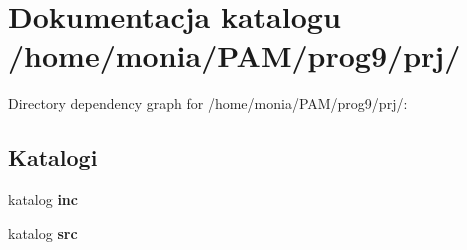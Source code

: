 \section{\-Dokumentacja katalogu /home/monia/\-P\-A\-M/prog9/prj/}
\label{dir_09d352d84568c784d5c2b0126c0f5faf}
\-Directory dependency graph for /home/monia/\-P\-A\-M/prog9/prj/\-:
\subsection*{\-Katalogi}
\begin{DoxyCompactItemize}
\item 
katalog {\bf inc}
\item 
katalog {\bf src}
\end{DoxyCompactItemize}
